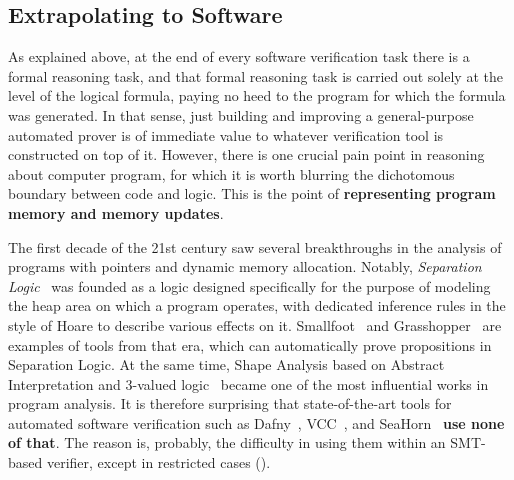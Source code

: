 \subsection{Extrapolating to Software}

As explained above, at the end of every software verification task there is a formal reasoning task, and that formal reasoning task is carried out solely at the level of the logical formula, paying no heed to the program for which the formula was generated.
In that sense, just building and improving a general-purpose automated prover is of immediate value to whatever verification tool is constructed on top of it.
However, there is one crucial pain point in reasoning about computer program, for which it is worth blurring the dichotomous boundary between code and logic.
This is the point of \textbf{representing program memory and memory updates}.

The first decade of the 21st century saw several breakthroughs in the analysis of programs with pointers and dynamic memory allocation.
Notably, \emph{Separation Logic}~\cite{Reynolds} was founded as a logic designed specifically for the purpose of modeling the heap area on which a program operates,
with dedicated inference rules in the style of Hoare to describe various effects on it.
Smallfoot~\cite{berdine} and Grasshopper~\cite{weis} are examples of tools from that era, which can automatically prove propositions in Separation Logic.
At the same time, Shape Analysis based on Abstract Interpretation and 3-valued logic~\cite{sagiv-reps} became one of the most influential works in program analysis.
It is therefore surprising that state-of-the-art tools for automated software verification such as Dafny~\cite{dafny}, VCC~\cite{vcc}, and SeaHorn~\cite{seahorn} \textbf{use none of that}.
The reason is, probably, the difficulty in using them within an SMT-based verifier, except in restricted cases
(\eg \cite{CAV2013:Piskac}).